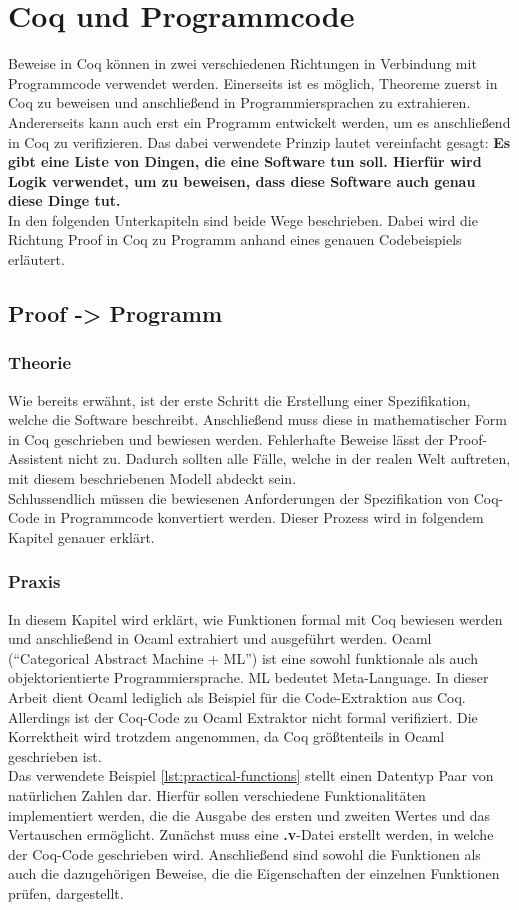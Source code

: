 \section{Coq und Programmcode}
\label{s:coq-and-code}
Beweise in Coq können in zwei verschiedenen Richtungen in Verbindung mit Programmcode verwendet werden. Einerseits ist es möglich, Theoreme zuerst in Coq zu beweisen und anschließend in Programmiersprachen zu extrahieren. Andererseits kann auch erst ein Programm entwickelt werden, um es anschließend in Coq zu verifizieren. Das dabei verwendete Prinzip lautet vereinfacht gesagt:
\textbf{Es gibt eine Liste von Dingen, die eine Software tun soll. Hierfür wird Logik verwendet, um zu beweisen, dass diese Software auch genau diese Dinge tut.}
\\
In den folgenden Unterkapiteln sind beide Wege beschrieben. Dabei wird die Richtung Proof in Coq zu Programm anhand eines genauen Codebeispiels erläutert.


\subsection{Proof -> Programm}
\subsubsection{Theorie}
{Wie bereits erwähnt, ist der erste Schritt die Erstellung einer Spezifikation, welche die Software beschreibt. Anschließend muss diese in mathematischer Form in Coq geschrieben und bewiesen werden. Fehlerhafte Beweise lässt der Proof-Assistent nicht zu.
Dadurch sollten alle Fälle, welche in der realen Welt auftreten, mit diesem beschriebenen Modell abdeckt sein.\\
Schlussendlich müssen die bewiesenen Anforderungen der Spezifikation von Coq-Code in Programmcode konvertiert werden. Dieser Prozess wird in folgendem Kapitel genauer erklärt.}\cite{HELWER01:FV}

\subsubsection{Praxis}
In diesem Kapitel wird erklärt, wie Funktionen formal mit Coq bewiesen werden und anschließend in Ocaml extrahiert und ausgeführt werden. Ocaml ("`Categorical Abstract Machine + ML"') ist eine sowohl funktionale als auch objektorientierte Programmiersprache. ML bedeutet Meta-Language. In dieser Arbeit dient Ocaml lediglich als Beispiel für die Code-Extraktion aus Coq. Allerdings ist der Coq-Code zu Ocaml Extraktor nicht formal verifiziert. Die Korrektheit wird trotzdem angenommen, da Coq größtenteils in Ocaml geschrieben ist.\\
Das verwendete Beispiel \ref{lst:practical-functions} stellt einen Datentyp Paar von natürlichen Zahlen dar. Hierfür sollen verschiedene Funktionalitäten implementiert werden, die die Ausgabe des ersten und zweiten Wertes und das Vertauschen ermöglicht.
Zunächst muss eine \textbf{.v}-Datei erstellt werden, in welche der Coq-Code geschrieben wird. Anschließend sind sowohl die Funktionen als auch die dazugehörigen Beweise, die die Eigenschaften der einzelnen Funktionen prüfen, dargestellt.

